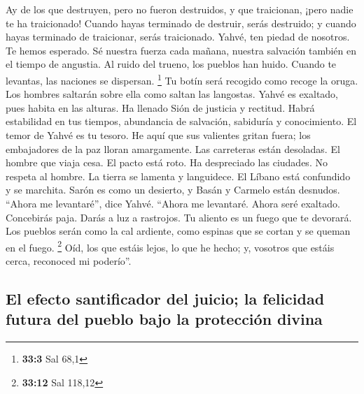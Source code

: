  Ay de los que destruyen, pero no fueron destruidos, y que
traicionan, ¡pero nadie te ha traicionado! Cuando hayas terminado de
destruir, serás destruido; y cuando hayas terminado de traicionar, serás
traicionado.  Yahvé, ten piedad de nosotros. Te hemos
esperado. Sé nuestra fuerza cada mañana, nuestra salvación también en el
tiempo de angustia.  Al ruido del trueno, los pueblos han
huido. Cuando te levantas, las naciones se dispersan. \footnote{\textbf{33:3}
  Sal 68,1}  Tu botín será recogido como recoge la oruga.
Los hombres saltarán sobre ella como saltan las langostas.
 Yahvé es exaltado, pues habita en las alturas. Ha llenado
Sión de justicia y rectitud.  Habrá estabilidad en tus
tiempos, abundancia de salvación, sabiduría y conocimiento. El temor de
Yahvé es tu tesoro.  He aquí que sus valientes gritan
fuera; los embajadores de la paz lloran amargamente.  Las
carreteras están desoladas. El hombre que viaja cesa. El pacto está
roto. Ha despreciado las ciudades. No respeta al hombre. 
La tierra se lamenta y languidece. El Líbano está confundido y se
marchita. Sarón es como un desierto, y Basán y Carmelo están desnudos.
 ``Ahora me levantaré'', dice Yahvé. ``Ahora me
levantaré. Ahora seré exaltado.  Concebirás paja. Darás a
luz a rastrojos. Tu aliento es un fuego que te devorará. 
Los pueblos serán como la cal ardiente, como espinas que se cortan y se
queman en el fuego. \footnote{\textbf{33:12} Sal 118,12} 
Oíd, los que estáis lejos, lo que he hecho; y, vosotros que estáis
cerca, reconoced mi poderío''.

\hypertarget{el-efecto-santificador-del-juicio-la-felicidad-futura-del-pueblo-bajo-la-protecciuxf3n-divina}{%
\subsection{El efecto santificador del juicio; la felicidad futura del
pueblo bajo la protección
divina}\label{el-efecto-santificador-del-juicio-la-felicidad-futura-del-pueblo-bajo-la-protecciuxf3n-divina}}

